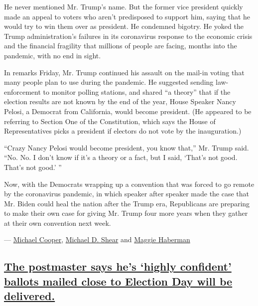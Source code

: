 He never mentioned Mr. Trump's name. But the former vice president
quickly made an appeal to voters who aren't predisposed to support him,
saying that he would try to win them over as president. He condemned
bigotry. He yoked the Trump administration's failures in its coronavirus
response to the economic crisis and the financial fragility that
millions of people are facing, months into the pandemic, with no end in
sight.

In remarks Friday, Mr. Trump continued his assault on the mail-in voting
that many people plan to use during the pandemic. He suggested sending
law-enforcement to monitor polling stations, and shared ``a theory''
that if the election results are not known by the end of the year, House
Speaker Nancy Pelosi, a Democrat from California, would become
president. (He appeared to be referring to Section One of the
Constitution, which says the House of Representatives picks a president
if electors do not vote by the inauguration.)

``Crazy Nancy Pelosi would become president, you know that,'' Mr. Trump
said. ``No. No. I don't know if it's a theory or a fact, but I said,
`That's not good. That's not good.' ''

Now, with the Democrats wrapping up a convention that was forced to go
remote by the coronavirus pandemic, in which speaker after speaker made
the case that Mr. Biden could heal the nation after the Trump era,
Republicans are preparing to make their own case for giving Mr. Trump
four more years when they gather at their own convention next week.

--- \href{https://www.nytimes3xbfgragh.onion/by/michael-cooper}{Michael
Cooper},
\href{https://www.nytimes3xbfgragh.onion/by/michael-d-shear}{Michael D.
Shear} and
\href{https://www.nytimes3xbfgragh.onion/by/maggie-haberman}{Maggie
Haberman}

\hypertarget{the-postmaster-says-hes-highly-confident-ballots-mailed-close-to-election-day-will-be-delivered}{%
\subsection{\texorpdfstring{\protect\hyperlink{the-postmaster-says-hes-highly-confident-ballots-mailed-close-to-election-day-will-be-delivered}{The
postmaster says he's `highly confident' ballots mailed close to Election
Day will be
delivered.}}{The postmaster says he's `highly confident' ballots mailed close to Election Day will be delivered.}}\label{the-postmaster-says-hes-highly-confident-ballots-mailed-close-to-election-day-will-be-delivered}}

